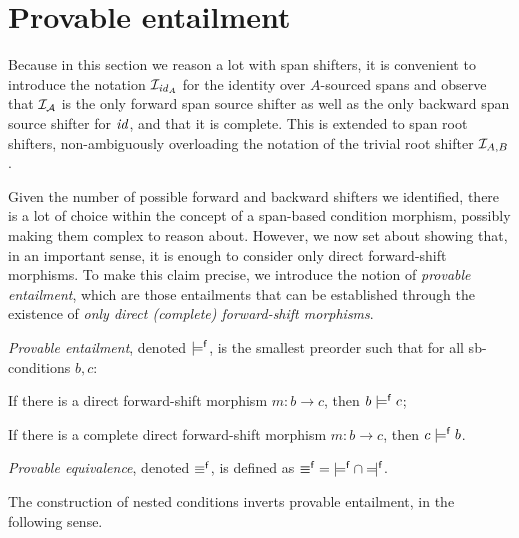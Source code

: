 \section{Provable entailment}

Because in this section we reason a lot with span shifters, it is convenient to introduce the notation $\mathcal{I}_{\mathit{id}_A}$ for the identity over $A$-sourced spans and observe that $\mathcal{I}_{\mathcal{A}}$ is the only forward span source shifter as well as the only backward span source shifter for $\mathit{id}$, and that it is complete. This is extended to span root shifters, non-ambiguously overloading the notation of the trivial root shifter $\mathcal{I}_{A,B}$.

Given the number of possible forward and backward shifters we identified, there is a lot of choice within the concept of a span-based condition morphism, possibly making them complex to reason about. However, we now set about showing that, in an important sense, it is enough to consider only direct forward-shift morphisms. To make this claim precise, we introduce the notion of \emph{provable entailment}, which are those entailments that can be established through the existence of \emph{only direct (complete) forward-shift morphisms}.

\begin{definition}
\emph{Provable entailment}, denoted $\models^{\mathsf f}$, is the smallest preorder such that for all sb-conditions $b,c$:
\begin{itemizeS}
\item If there is a direct forward-shift morphism $m:b\to c$, then $b\models^{\mathsf f} c$;
\item If there is a complete direct forward-shift morphism $m:b\to c$, then $c\models^{\mathsf f} b$.
\end{itemizeS}
\emph{Provable equivalence}, denoted $\equiv^{\mathsf f}$, is defined as ${\pequiv}={\pentails}\cap{\pentailedby}$.
\end{definition}
%
The construction of nested conditions inverts provable entailment, in the following sense.

